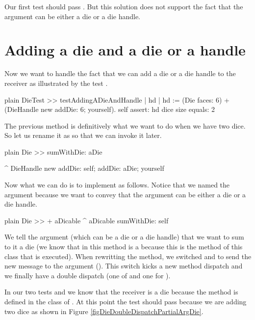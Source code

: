 \documentclass[10pt,twoside,english]{_support/latex/sbabook/sbabook}
\begin{document}
Our first test should pass .
But this solution does not support the fact that the argument can be either a die or a die handle.
\section{Adding a die and a die or a handle}
Now we want to handle the fact that we can add a die or a die handle to the receiver as illustrated by the test .

\begin{displaycode}{plain}
DieTest >> testAddingADieAndHandle
	| hd |
	hd := (Die faces: 6)
		+
		(DieHandle new
			addDie: 6;
			yourself).
	self assert: hd dice size equals: 2
\end{displaycode}

The previous method \textcode{+} is definitively what we want to do when we have two dice. So let us rename it as  so that we can invoke it later. 

\begin{displaycode}{plain}
Die >> sumWithDie: aDie

	^ DieHandle new
		addDie: self;
		addDie: aDie; yourself
\end{displaycode}

Now what we can do is to implement \textcode{+} as follows. Notice that we named the argument  because we want to convey that the argument can be either a die or a die handle. 

\begin{displaycode}{plain}
Die >> + aDicable	
	^ aDicable sumWithDie: self
\end{displaycode}

We tell the argument  (which can be a die or a die handle) that we want to sum to it a die (we know that   in this method is a  because this is the method of this class that is executed). When rewritting the \textcode{+} method, we switched  and  to send the new message  to the argument (). This switch kicks a new method dispatch and we finally have a double dispatch (one of \textcode{+} and one for ).

In our two tests  and  we know that the receiver is a die because the method is defined in the class of . At this point the test  should pass because we are adding two dice as shown in Figure \ref{figDieDoubleDispatchPartialArgDie}.
\end{document}
